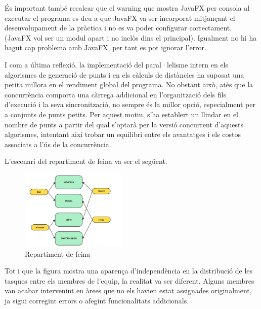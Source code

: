 \documentclass{ieeetj}
\begin{document}
És important també recalcar que el warning que mostra JavaFX per consola al executar el programa es deu a que JavaFX va ser incorporat mitjançant el desenvolupament de la pràctica i no es va poder configurar correctament. (JavaFX vol ser un modul apart i no inclòs dins el principal). Igualment no hi ha hagut cap problema amb JavaFX, per tant es pot ignorar l'error.

I com a última reflexió, la implementació del paral·lelisme intern en els algorismes de generació de punts i en els càlculs de distàncies ha suposat una petita millora en el rendiment global del programa. No obstant això, atès que la concurrència comporta una càrrega addicional en l'organització dels fils d'execució i la seva sincronització, no sempre és la millor opció, especialment per a conjunts de punts petits. Per aquest motiu, s'ha establert un llindar en el nombre de punts a partir del qual s'optarà per la versió concurrent d'aquests algorismes, intentant així trobar un equilibri entre els avantatges i els costos associats a l'ús de la concurrència.

L'escenari del repartiment de feina va ser el següent.

\begin{figure}[h]
    \centerline{\includegraphics[width=0.45\textwidth]{docs/png/repartiment.jpg}}
    \caption{Repartiment de feina}
    \label{fig:distMin}
\end{figure}

Tot i que la figura mostra una aparença d'independència en la distribució de les tasques entre els membres de l'equip, la realitat va ser diferent. Alguns membres van acabar intervenint en àrees que no els havien estat assignades originalment, ja sigui corregint errors o afegint funcionalitats addicionals.
\end{document}
